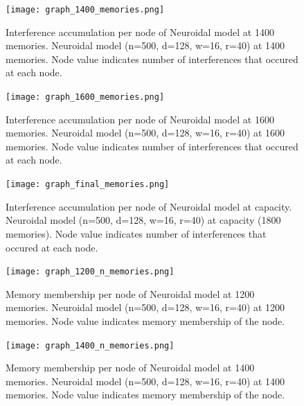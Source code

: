 \begin{figure}%
    \centering
    \texttt{[image: graph\_1400\_memories.png]}
    \caption[Interference accumulation per node of Neuroidal model at 1400 memories]{Interference accumulation per node of Neuroidal model at 1400 memories. \textmd{Neuroidal model (n=500, d=128, w=16, r=40) at 1400 memories. Node value indicates number of interferences that occured at each node.}}
    \label{fig:sub2}
\end{figure}

\begin{figure}%
    \centering
    \texttt{[image: graph\_1600\_memories.png]}
    \caption[Interference accumulation per node of Neuroidal model at 1600 memories]{Interference accumulation per node of Neuroidal model at 1600 memories. \textmd{Neuroidal model (n=500, d=128, w=16, r=40) at 1600 memories. Node value indicates number of interferences that occured at each node.}}
    \label{fig:sub3}
\end{figure}

\begin{figure}%
    \centering
    \texttt{[image: graph\_final\_memories.png]}
    \caption[Interference accumulation per node of Neuroidal model at capacity]{Interference accumulation per node of Neuroidal model at capacity. \textmd{Neuroidal model (n=500, d=128, w=16, r=40) at capacity (1800 memories). Node value indicates number of interferences that occured at each node.}}
    \label{fig:sub4}
\end{figure}

\begin{figure}%
    \centering
    \texttt{[image: graph\_1200\_n\_memories.png]}
    \caption[Memory membership per node of Neuroidal model at 1200 memories]{Memory membership per node of Neuroidal model at 1200 memories. \textmd{Neuroidal model (n=500, d=128, w=16, r=40) at 1200 memories. Node value indicates memory membership of the node.}}
    \label{fig:subn1}
\end{figure}

\begin{figure}%
    \centering
    \texttt{[image: graph\_1400\_n\_memories.png]}
    \caption[Memory membership per node of Neuroidal model at 1400 memories]{Memory membership per node of Neuroidal model at 1400 memories. \textmd{Neuroidal model (n=500, d=128, w=16, r=40) at 1400 memories. Node value indicates memory membership of the node.}}
    \label{fig:subn2}
\end{figure}

